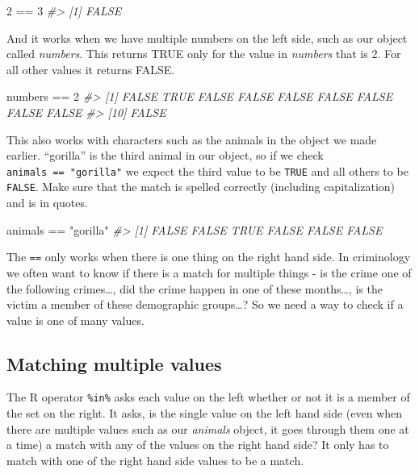 \documentclass[
]{krantz}
\makeatletter
\newenvironment{Shaded}{\begin{snugshade}}{\end{snugshade}}
\newcommand{\CommentTok}[1]{\textcolor[rgb]{0.37,0.37,0.37}{\textit{#1}}}
\newcommand{\DecValTok}[1]{\textcolor[rgb]{0.06,0.06,0.06}{#1}}
\newcommand{\NormalTok}[1]{#1}
\newcommand{\SpecialCharTok}[1]{\textcolor[rgb]{0,0,0}{#1}}
\newcommand{\StringTok}[1]{\textcolor[rgb]{0.5,0.5,0.5}{#1}}
\newenvironment{kframe}{%
\medskip{}
\setlength{\fboxsep}{.8em}
 \def\at@end@of@kframe{}%
 \ifinner\ifhmode%
  \def\at@end@of@kframe{\end{minipage}}%
  \begin{minipage}{\columnwidth}%
 \fi\fi%
 \def\FrameCommand##1{\hskip\@totalleftmargin \hskip-\fboxsep
 \colorbox{shadecolor}{##1}\hskip-\fboxsep
     \hskip-\linewidth \hskip-\@totalleftmargin \hskip\columnwidth}%
 \MakeFramed {\advance\hsize-\width
   \@totalleftmargin\z@ \linewidth\hsize
   \@setminipage}}%
 {\par\unskip\endMakeFramed%
 \at@end@of@kframe}
\renewenvironment{Shaded}{\begin{kframe}}{\end{kframe}}
\makeatother
\begin{document}
\begin{Shaded}
\begin{Highlighting}[]
\DecValTok{2} \SpecialCharTok{==} \DecValTok{3}
\CommentTok{\#\textgreater{} [1] FALSE}
\end{Highlighting}
\end{Shaded}

And it works when we have multiple numbers on the left side,
such as our object called \emph{numbers}. This returns TRUE
only for the value in \emph{numbers} that is 2. For all
other values it returns FALSE.

\begin{Shaded}
\begin{Highlighting}[]
\NormalTok{numbers }\SpecialCharTok{==} \DecValTok{2}
\CommentTok{\#\textgreater{}  [1] FALSE  TRUE FALSE FALSE FALSE FALSE FALSE FALSE FALSE}
\CommentTok{\#\textgreater{} [10] FALSE}
\end{Highlighting}
\end{Shaded}

This also works with characters such as the animals in the
object we made earlier. ``gorilla'' is the third animal in
our object, so if we check \texttt{animals\ ==\ "gorilla"}
we expect the third value to be \texttt{TRUE} and all others
to be \texttt{FALSE}. Make sure that the match is spelled
correctly (including capitalization) and is in quotes.

\begin{Shaded}
\begin{Highlighting}[]
\NormalTok{animals }\SpecialCharTok{==} \StringTok{"gorilla"}
\CommentTok{\#\textgreater{} [1] FALSE FALSE  TRUE FALSE FALSE FALSE}
\end{Highlighting}
\end{Shaded}

The \texttt{==} only works when there is one thing on the
right hand side. In criminology we often want to know if
there is a match for multiple things - is the crime one of
the following crimes\ldots, did the crime happen in one of
these months\ldots, is the victim a member of these
demographic groups\ldots? So we need a way to check if a
value is one of many values.

\hypertarget{matching-multiple-values}{%
\subsection{Matching multiple
values}\label{matching-multiple-values}}

The R operator \texttt{\%in\%} asks each value on the left
whether or not it is a member of the set on the right. It
asks, is the single value on the left hand side (even when
there are multiple values such as our \emph{animals} object,
it goes through them one at a time) a match with any of the
values on the right hand side? It only has to match with one
of the right hand side values to be a match.
\end{document}
